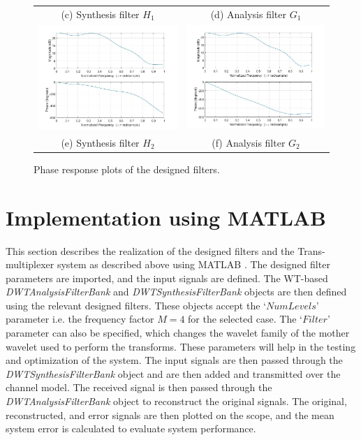\begin{figure}[htpb]
\begin{tabular}{cc}
(c) Synthesis filter $H_1$  & (d) Analysis filter $G_1$  \\
\includegraphics[trim={0 0 0 9.3cm}, clip,width=75mm]{H2.jpg} & \includegraphics[trim={0 0 0 9.3cm}, clip,width=75mm]{G2.jpg} \\
(e) Synthesis filter $H_2$ & (f) Analysis filter $G_2$\\[6pt]
\end{tabular}
\caption{Phase response plots of the designed filters.}
\label{phase_resp}
\end{figure}


\section{Implementation using MATLAB}
This section describes the realization of the designed filters and the Trans-multiplexer system as described above using MATLAB \cite{b20}. The designed filter parameters are imported, and the input signals are defined. The WT-based \textit{DWTAnalysisFilterBank} and \textit{DWTSynthesisFilterBank} objects are then defined using the relevant designed filters. These objects accept the `$NumLevels$' parameter i.e. the frequency factor $M = 4$ for the selected case. The `$Filter$' parameter can also be specified, which changes the wavelet family of the mother wavelet used to perform the transforms. These parameters will help in the testing and optimization of the system. The input signals are then passed through the \textit{DWTSynthesisFilterBank} object and are then added and transmitted over the channel model. The received signal is then passed through the \textit{DWTAnalysisFilterBank} object to reconstruct the original signals. The original, reconstructed, and error signals are then plotted on the scope, and the mean system error is calculated to evaluate system performance. 



